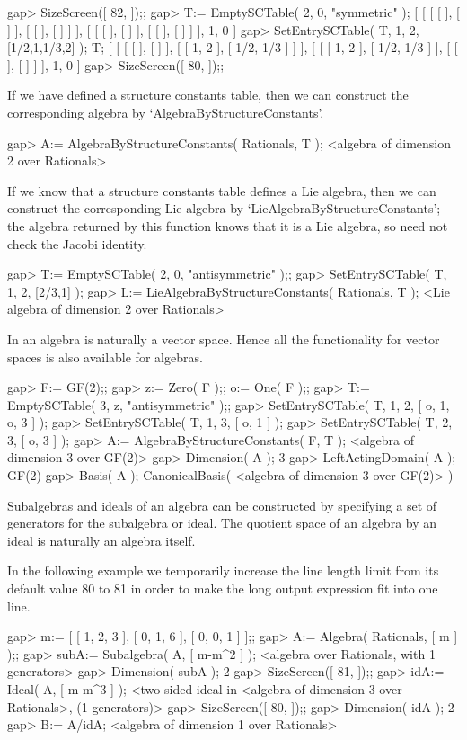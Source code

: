 \beginexample
gap> SizeScreen([ 82, ]);;
gap> T:= EmptySCTable( 2, 0, "symmetric" );
[ [ [ [  ], [  ] ], [ [  ], [  ] ] ], [ [ [  ], [  ] ], [ [  ], [  ] ] ], 1, 0 ]
gap> SetEntrySCTable( T, 1, 2, [1/2,1,1/3,2] );  T;
[ [ [ [  ], [  ] ], [ [ 1, 2 ], [ 1/2, 1/3 ] ] ], 
  [ [ [ 1, 2 ], [ 1/2, 1/3 ] ], [ [  ], [  ] ] ], 1, 0 ]
gap> SizeScreen([ 80, ]);;
\endexample

If we have defined a structure constants table, then we can construct
the corresponding algebra by `AlgebraByStructureConstants'.

\beginexample
gap> A:= AlgebraByStructureConstants( Rationals, T );
<algebra of dimension 2 over Rationals>
\endexample

If we know that a structure constants table defines a Lie algebra,
then we can construct the corresponding Lie algebra by
`LieAlgebraByStructureConstants';
the algebra returned by this function knows that it is a Lie algebra,
so {\GAP} need not check the Jacobi identity.

\beginexample
gap> T:= EmptySCTable( 2, 0, "antisymmetric" );;
gap> SetEntrySCTable( T, 1, 2, [2/3,1] );
gap> L:= LieAlgebraByStructureConstants( Rationals, T );
<Lie algebra of dimension 2 over Rationals>
\endexample

In {\GAP} an algebra is naturally a vector space. Hence all the functionality
for vector spaces is also available for algebras.

\beginexample
gap> F:= GF(2);;
gap> z:= Zero( F );;  o:= One( F );;
gap> T:= EmptySCTable( 3, z, "antisymmetric" );;
gap> SetEntrySCTable( T, 1, 2, [ o, 1, o, 3 ] );
gap> SetEntrySCTable( T, 1, 3, [ o, 1 ] );
gap> SetEntrySCTable( T, 2, 3, [ o, 3 ] );
gap> A:= AlgebraByStructureConstants( F, T );
<algebra of dimension 3 over GF(2)>
gap> Dimension( A );
3
gap> LeftActingDomain( A );
GF(2)
gap> Basis( A );
CanonicalBasis( <algebra of dimension 3 over GF(2)> )
\endexample

Subalgebras and ideals of an algebra can be constructed by specifying
a set of generators for the subalgebra or ideal. The quotient space
of an algebra by an ideal is naturally an algebra itself.

In the following example we temporarily increase the line length limit from
its default value 80 to 81 in order to make the long output expression fit
into one line.

\beginexample
gap> m:= [ [ 1, 2, 3 ], [ 0, 1, 6 ], [ 0, 0, 1 ] ];;
gap> A:= Algebra( Rationals, [ m ] );;
gap> subA:= Subalgebra( A, [ m-m^2 ] );
<algebra over Rationals, with 1 generators>
gap> Dimension( subA );
2
gap> SizeScreen([ 81, ]);;
gap> idA:= Ideal( A, [ m-m^3 ] );
<two-sided ideal in <algebra of dimension 3 over Rationals>, (1 generators)>
gap> SizeScreen([ 80, ]);;
gap> Dimension( idA ); 
2
gap> B:= A/idA;
<algebra of dimension 1 over Rationals>
\endexample


